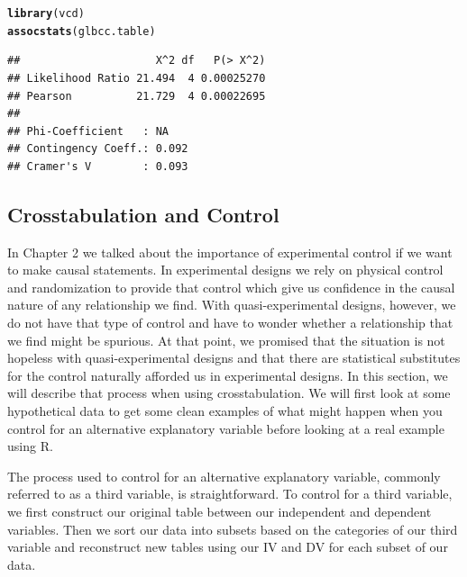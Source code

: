 \documentclass[11pt,openany]{book}\usepackage[]{graphicx}\usepackage[]{color}
\makeatletter
\newcommand{\hlstd}[1]{\textcolor[rgb]{0.345,0.345,0.345}{#1}}%
\newcommand{\hlkwd}[1]{\textcolor[rgb]{0.737,0.353,0.396}{\textbf{#1}}}%
\newenvironment{kframe}{%
 \def\at@end@of@kframe{}%
 \ifinner\ifhmode%
  \def\at@end@of@kframe{\end{minipage}}%
  \begin{minipage}{\columnwidth}%
 \fi\fi%
 \def\FrameCommand##1{\hskip\@totalleftmargin \hskip-\fboxsep
 \colorbox{shadecolor}{##1}\hskip-\fboxsep
     \hskip-\linewidth \hskip-\@totalleftmargin \hskip\columnwidth}%
 \MakeFramed {\advance\hsize-\width
   \@totalleftmargin\z@ \linewidth\hsize
   \@setminipage}}%
 {\par\unskip\endMakeFramed%
 \at@end@of@kframe}
\newenvironment{knitrout}{}{} %
\renewenvironment{knitrout}{\begin{singlespace}}{\end{singlespace}}
\makeatother
\begin{document}
\begin{knitrout}
\color{fgcolor}\begin{kframe}
\begin{alltt}
\hlkwd{library}\hlstd{(vcd)}
\hlkwd{assocstats}\hlstd{(glbcc.table)}
\end{alltt}
\begin{verbatim}
##                     X^2 df   P(> X^2)
## Likelihood Ratio 21.494  4 0.00025270
## Pearson          21.729  4 0.00022695
## 
## Phi-Coefficient   : NA 
## Contingency Coeff.: 0.092 
## Cramer's V        : 0.093
\end{verbatim}
\end{kframe}
\end{knitrout}

\subsection{Crosstabulation and Control}

In Chapter 2 we talked about the importance of experimental control if we want to make causal statements.  In experimental designs we rely on physical control and randomization to provide that control which give us confidence in the causal nature of any relationship we find.  With quasi-experimental designs, however, we do not have that type of control and have to wonder whether a relationship that we find might be spurious.   At that point, we promised that the situation is not hopeless with quasi-experimental designs and that there are statistical substitutes for the control naturally afforded us in experimental designs.  In this section, we will describe that process when using crosstabulation.  We will first look at some hypothetical data to get some clean examples of what might happen when you control for an alternative explanatory variable before looking at a real example using R.

The process used to control for an alternative explanatory variable, commonly referred to as a third variable, is straightforward.   To control for a third variable, we first construct our original table between our independent and dependent variables.  Then we sort our data into subsets based on the categories of our third variable and reconstruct new tables using our IV and DV for each subset of our data. 
\end{document}
